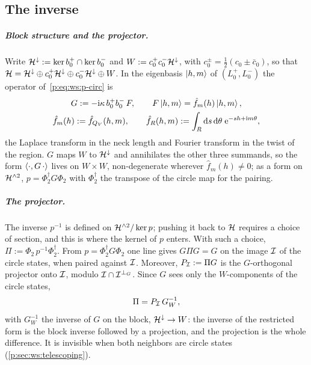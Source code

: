 \subsection{The inverse}
\label{icg:sec:inverse}

\subparagraph{Block structure and the projector.}
Write ${\mathcal{H}}^\downarrow := \ker b_0^+ \cap \ker b_0^-$ and $W := c_0^+ c_0^- {\mathcal{H}}^\downarrow$, with $c_0^\pm = \tfrac12 (c_0 \pm \bar c_0)$, so that ${\mathcal{H}} = {\mathcal{H}}^\downarrow \oplus c_0^+ {\mathcal{H}}^\downarrow \oplus c_0^- {\mathcal{H}}^\downarrow \oplus W$.
In the eigenbasis $\ket{h, m}$ of $(L_0^+, L_0^-)$ the operator of~\eqref{p:eq:ws:p-circ} is
\begin{gather}
  \label{icg:eq:G}
  G
    := - \mathrm{i} \kappa \, b_0^+ b_0^- \, F,
  \qquad
  F \ket{h, m}
    = \hat f_m(h) \ket{h, m},
  \\
  \label{icg:eq:fhat}
  \hat f_m(h)
    := \hat f_{Q_V}(h, m),
  \qquad
  \hat f_R(h, m)
    := \int_{R} \mathrm{d} s \, \mathrm{d}\theta \; \mathrm{e}^{-s h + \mathrm{i} m \theta},
\end{gather}
the Laplace transform in the neck length and Fourier transform in the twist of the region.
$G$ maps $W$ to ${\mathcal{H}}^\downarrow$ and annihilates the other three summands, so the form $\braket{\cdot, G \, \cdot}$ lives on $W \times W$, non-degenerate wherever $\hat f_m(h) \neq 0$; as a form on ${\mathcal{H}}^{\wedge 2}$, $p = \Phi_2^\dagger G \Phi_2$ with $\Phi_2^\dagger$ the transpose of the circle map for the pairing.

\subparagraph{The projector.}
The inverse $p^{-1}$ is defined on ${\mathcal{H}}^{\wedge 2} / \ker p$; pushing it back to ${\mathcal{H}}$ requires a choice of section, and this is where the kernel of $p$ enters.
With such a choice, $\Pi := \Phi_2\, p^{-1} \Phi_2^\dagger$.
From $p = \Phi_2^\dagger G \Phi_2$ one line gives $G \Pi G = G$ on the image ${\mathcal{I}}$ of the circle states, when paired against ${\mathcal{I}}$.
Moreover, $P_{{\mathcal{I}}} := \Pi G$ is the $G$-orthogonal projector onto ${\mathcal{I}}$, modulo ${\mathcal{I}} \cap {\mathcal{I}}^{\perp_G}$.
Since $G$ sees only the $W$-components of the circle states,
\begin{equation}
  \label{icg:eq:Pi}
  \Pi
    = P_{{\mathcal{I}}} \, G_W^{-1},
\end{equation}
with $G_W^{-1}$ the inverse of $G$ on the block, ${\mathcal{H}}^\downarrow \to W$: the inverse of the restricted form is the block inverse followed by a projection, and the projection is the whole difference.
It is invisible when both neighbors are circle states (\cref{p:sec:ws:telescoping}).

